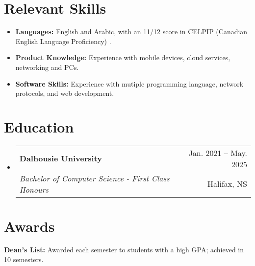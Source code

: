 \documentclass[letterpaper,11pt]{article}
\makeatletter
\newcommand{\resumeItem}[1]{
  \item\small{
    {#1 \vspace{-2pt}}
  }
}
\newcommand{\resumeSubheading}[4]{
  \vspace{-2pt}\item
    \begin{tabular*}{0.97\textwidth}[t]{l@{\extracolsep{\fill}}r}
      \textbf{#1} & #2 \\
			\textit{\small#3} & \small #4 \\
    \end{tabular*}\vspace{-7pt}
}
\newcommand{\resumeSubHeadingListStart}{\begin{itemize}[leftmargin=0.15in, label={}]}
\newcommand{\resumeSubHeadingListEnd}{\end{itemize}}
\newcommand{\resumeItemListStart}{\begin{itemize}}
\newcommand{\resumeItemListEnd}{\end{itemize}\vspace{-5pt}}
\makeatother
\begin{document}

\vspace{5pt}
\section{Relevant Skills}
  \resumeItemListStart
		\resumeItem{\textbf{Languages:} English and Arabic, with an 11/12 score in CELPIP (Canadian English Language Proficiency) .}
		\resumeItem{\textbf{Product Knowledge: }{Experience with mobile devices, cloud services, networking and PCs.}} \\
		\resumeItem{\textbf{Software Skills: } Experience with mutiple programming language, network protocols, and web development.}
	\resumeItemListEnd 



\vspace{5pt}
\section{Education}
  \resumeSubHeadingListStart
    \resumeSubheading
      {Dalhousie University}{Jan. 2021 -- May. 2025}
      {Bachelor of Computer Science - First Class Honours}
      {Halifax, NS}
    
  \resumeSubHeadingListEnd


\section{Awards}
 \begin{itemize}[leftmargin=0.15in, label={}]
    \small{\item{
   
     \textbf{Dean's List:}{ Awarded each semester to students with a high GPA; achieved in 10 semesters.}
    
    }}
 \end{itemize}


\end{document}
